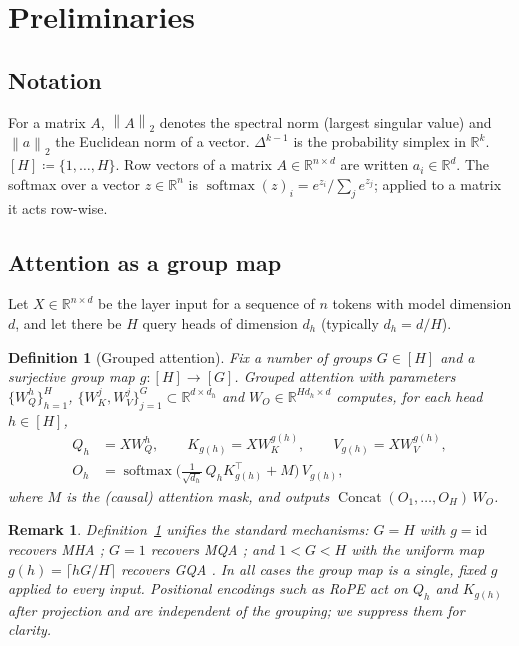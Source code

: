\documentclass{article}
\newtheorem{definition}[theorem]{Definition}
\newtheorem{remark}[theorem]{Remark}
\newcommand{\R}{\mathbb{R}}
\newcommand{\softmax}{\operatorname{softmax}}
\newcommand{\norm}[1]{\left\lVert #1 \right\rVert}
\newcommand{\opnorm}[1]{\left\lVert #1 \right\rVert_{2}}
\begin{document}
\section{Preliminaries}
\label{sec:prelim}

\subsection{Notation}
For a matrix $A$, $\opnorm{A}$ denotes the spectral norm (largest singular
value) and $\norm{a}_2$ the Euclidean norm of a vector. $\Delta^{k-1}$ is
the probability simplex in $\R^k$. $[H] \coloneqq \{1,\dots,H\}$. Row
vectors of a matrix $A \in \R^{n\times d}$ are written $a_i \in \R^{d}$.
The softmax over a vector $z\in\R^n$ is
$\softmax(z)_i = e^{z_i}/\sum_j e^{z_j}$; applied to a matrix it acts
row-wise.

\subsection{Attention as a group map}

Let $X \in \R^{n \times d}$ be the layer input for a sequence of $n$ tokens
with model dimension $d$, and let there be $H$ query heads of dimension
$d_h$ (typically $d_h = d/H$).

\begin{definition}[Grouped attention]
\label{def:grouped}
Fix a number of groups $G \in [H]$ and a surjective \emph{group map}
$g : [H] \to [G]$. Grouped attention with parameters
$\{W_Q^h\}_{h=1}^H$, $\{W_K^j, W_V^j\}_{j=1}^G \subset \R^{d \times d_h}$ and
$W_O \in \R^{H d_h \times d}$ computes, for each head $h \in [H]$,
\begin{align}
Q_h &= X W_Q^h, \qquad
K_{g(h)} = X W_K^{g(h)}, \qquad
V_{g(h)} = X W_V^{g(h)}, \\
O_h &= \softmax\!\Big(\tfrac{1}{\sqrt{d_h}}\, Q_h K_{g(h)}^{\top} + M\Big)\, V_{g(h)},
\label{eq:headout}
\end{align}
where $M$ is the (causal) attention mask, and outputs
$\operatorname{Concat}(O_1,\dots,O_H)\, W_O$.
\end{definition}

\begin{remark}
Definition~\ref{def:grouped} unifies the standard mechanisms:
$G = H$ with $g = \mathrm{id}$ recovers MHA \citep{vaswani2017attention};
$G = 1$ recovers MQA \citep{shazeer2019fast}; and $1 < G < H$ with the
uniform map $g(h) = \lceil h G / H \rceil$ recovers GQA
\citep{ainslie2023gqa}. In all cases the group map is a single, fixed
$g$ applied to every input. Positional encodings such as RoPE act on $Q_h$
and $K_{g(h)}$ after projection and are independent of the grouping; we
suppress them for clarity.
\end{remark}
\end{document}
